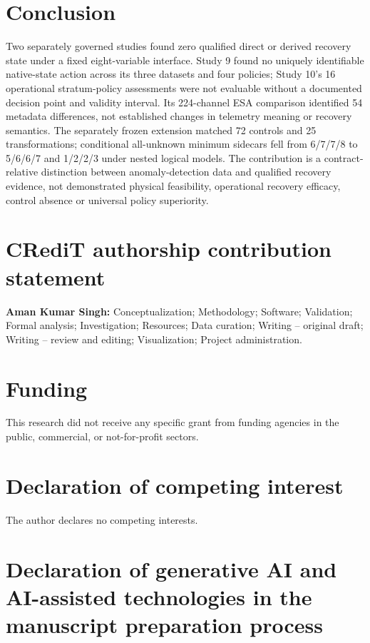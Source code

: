 \documentclass[preprint,12pt]{elsarticle}
\begin{document}
\section{Conclusion}

Two separately governed studies found zero qualified direct or derived recovery state under a fixed eight-variable interface. Study 9 found no uniquely identifiable native-state action across its three datasets and four policies; Study 10's 16 operational stratum-policy assessments were not evaluable without a documented decision point and validity interval. Its 224-channel ESA comparison identified 54 metadata differences, not established changes in telemetry meaning or recovery semantics. The separately frozen extension matched 72 controls and 25 transformations; conditional all-unknown minimum sidecars fell from 6/7/7/8 to 5/6/6/7 and 1/2/2/3 under nested logical models. The contribution is a contract-relative distinction between anomaly-detection data and qualified recovery evidence, not demonstrated physical feasibility, operational recovery efficacy, control absence or universal policy superiority.

\section*{CRediT authorship contribution statement}

\textbf{Aman Kumar Singh:} Conceptualization; Methodology; Software; Validation; Formal analysis; Investigation; Resources; Data curation; Writing -- original draft; Writing -- review and editing; Visualization; Project administration.

\section*{Funding}

This research did not receive any specific grant from funding agencies in the public, commercial, or not-for-profit sectors.

\section*{Declaration of competing interest}

The author declares no competing interests.

\section*{Declaration of generative AI and AI-assisted technologies in the manuscript preparation process}
\end{document}
